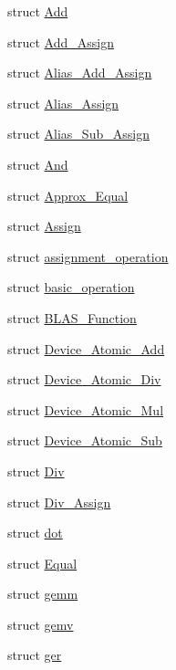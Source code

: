 \begin{DoxyCompactItemize}
\item 
struct \hyperlink{structbc_1_1oper_1_1Add}{Add}
\item 
struct \hyperlink{structbc_1_1oper_1_1Add__Assign}{Add\+\_\+\+Assign}
\item 
struct \hyperlink{structbc_1_1oper_1_1Alias__Add__Assign}{Alias\+\_\+\+Add\+\_\+\+Assign}
\item 
struct \hyperlink{structbc_1_1oper_1_1Alias__Assign}{Alias\+\_\+\+Assign}
\item 
struct \hyperlink{structbc_1_1oper_1_1Alias__Sub__Assign}{Alias\+\_\+\+Sub\+\_\+\+Assign}
\item 
struct \hyperlink{structbc_1_1oper_1_1And}{And}
\item 
struct \hyperlink{structbc_1_1oper_1_1Approx__Equal}{Approx\+\_\+\+Equal}
\item 
struct \hyperlink{structbc_1_1oper_1_1Assign}{Assign}
\item 
struct \hyperlink{structbc_1_1oper_1_1assignment__operation}{assignment\+\_\+operation}
\item 
struct \hyperlink{structbc_1_1oper_1_1basic__operation}{basic\+\_\+operation}
\item 
struct \hyperlink{structbc_1_1oper_1_1BLAS__Function}{B\+L\+A\+S\+\_\+\+Function}
\item 
struct \hyperlink{structbc_1_1oper_1_1Device__Atomic__Add}{Device\+\_\+\+Atomic\+\_\+\+Add}
\item 
struct \hyperlink{structbc_1_1oper_1_1Device__Atomic__Div}{Device\+\_\+\+Atomic\+\_\+\+Div}
\item 
struct \hyperlink{structbc_1_1oper_1_1Device__Atomic__Mul}{Device\+\_\+\+Atomic\+\_\+\+Mul}
\item 
struct \hyperlink{structbc_1_1oper_1_1Device__Atomic__Sub}{Device\+\_\+\+Atomic\+\_\+\+Sub}
\item 
struct \hyperlink{structbc_1_1oper_1_1Div}{Div}
\item 
struct \hyperlink{structbc_1_1oper_1_1Div__Assign}{Div\+\_\+\+Assign}
\item 
struct \hyperlink{structbc_1_1oper_1_1dot}{dot}
\item 
struct \hyperlink{structbc_1_1oper_1_1Equal}{Equal}
\item 
struct \hyperlink{structbc_1_1oper_1_1gemm}{gemm}
\item 
struct \hyperlink{structbc_1_1oper_1_1gemv}{gemv}
\item 
struct \hyperlink{structbc_1_1oper_1_1ger}{ger}

\end{DoxyCompactItemize}
